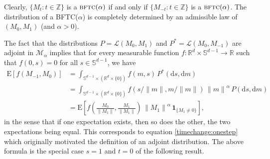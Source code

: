 \documentclass{aptpubarxiv}
\numberwithin{equation}{section}
\begin{document}
Clearly, $\{ M_t : t \in {\mathbb{Z}} \}$ is a ${\mbox{\sc bftc}}(\alpha)$ if and only if $\{ M_{-t} : t \in {\mathbb{Z}} \}$ is a ${\mbox{\sc bftc}}(\alpha)$. The distribution of a BFTC($\alpha$) is completely determined by an admissible law of $(M_0,M_1)$ (and $\alpha>0$). 

The fact that the distributions $P=\mathcal{L}(M_0, M_1)$ and $P^\ast=\mathcal{L}(M_0, M_{-1})$ are adjoint in $\mathcal{M}_\alpha$ implies that for every measurable function $f : {\mathbb{R}}^d \times \mathbb{S}^{d-1} \to {\mathbb{R}}$ such that $f(0, s) = 0$ for all $s \in \mathbb{S}^{d-1}$, we have
 \begin{align}
   {\mathrm{E}} [ f ( M_{-1}, M_0 ) ] \nonumber
  &= \int_{ \mathbb{S}^{d-1} \times ({\mathbb{R}}^d \times \{ 0 \}) } f( m, s ) \, P^\ast({\mathrm{d}s}, {\mathrm{d}m}) \nonumber \\
   &= \int_{ \mathbb{S}^{d-1} \times ({\mathbb{R}}^d \times \{ 0 \}) } f( s / {\|{m}\|}, m / {\|{m}\|} ) \, {\|{m}\|}^\alpha \, P({\mathrm{d}s}, {\mathrm{d}m}) \nonumber \\
   &= {\mathrm{E}} \left[ f \left( \frac{M_0}{{\|{M_1}\|}}, \frac{M_1}{{\|{M_1}\|}} \right) \, {\|{M_1}\|}^\alpha \, {\boldsymbol{1}}_{ \{ M_1 \ne 0 \} } \right],
 \label{eq:bftc:adjoint}
 \end{align}
in the sense that if one expectation exists, then so does the other, the two expectations being equal. This corresponds to equation \eqref{timechange:onestep} which originally motivated the definition of an adjoint distribution. The above formula is the special case $s = 1$ and $t = 0$ of the following result.
\end{document}
